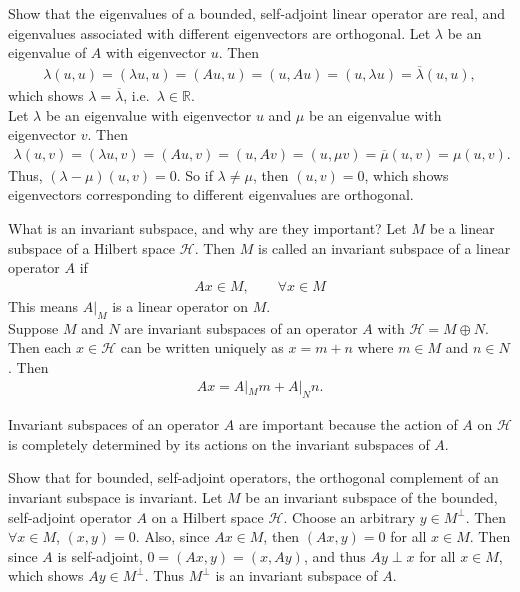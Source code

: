 \documentclass[avery5388,grid,frame]{flashcards}
\def\Rl{\mathbb{R}}
\def\hilb{\mathcal{H}}
\begin{document}
\begin{flashcard}
    {Show that the eigenvalues of a bounded, self-adjoint linear operator are real, and eigenvalues associated with different eigenvectors are orthogonal.}
    Let $\lambda$ be an eigenvalue of $A$ with eigenvector $u$.  Then
    \begin{align*}
        \lambda(u,u) = (\lambda u,u) = (Au,u) = (u,Au) = (u,\lambda u) = \overline{\lambda}(u,u),
    \end{align*}
    which shows $\lambda = \overline{\lambda}$, i.e.~$\lambda \in \Rl$. \\

    Let $\lambda$ be an eigenvalue with eigenvector $u$ and $\mu$ be an eigenvalue with eigenvector $v$.  Then
    \begin{align*}
        \lambda(u,v) = (\lambda u,v) = (Au, v) = (u, Av) = (u, \mu v) = \overline{\mu}(u,v) = \mu(u,v).
    \end{align*}
    Thus, $(\lambda - \mu)(u,v) = 0$.  So if $\lambda \neq \mu$, then $(u,v) = 0$, which shows eigenvectors corresponding to different eigenvalues are orthogonal.
\end{flashcard}

\begin{flashcard}
    {What is an invariant subspace, and why are they important?}
    Let $M$ be a linear subspace of a Hilbert space $\hilb$.  Then $M$ is called an invariant subspace of a linear operator $A$ if
    \begin{align*}
        Ax \in M, \qquad \forall x \in M
    \end{align*}
    This means $A|_M$ is a linear operator on $M$. \\

    Suppose $M$ and $N$ are invariant subspaces of an operator $A$ with $\hilb = M \oplus N$.  Then each $x \in \hilb$ can be written uniquely as $x = m + n$ where $m \in M$ and $n \in N$.  Then
    \begin{align*}
        Ax = A|_Mm + A|_Nn.
    \end{align*}

    Invariant subspaces of an operator $A$ are important because the action of $A$ on $\hilb$ is completely determined by its actions on the invariant subspaces of $A$.
\end{flashcard}

\begin{flashcard}
    {Show that for bounded, self-adjoint operators, the orthogonal complement of an invariant subspace is invariant.}
    Let $M$ be an invariant subspace of the bounded, self-adjoint operator $A$ on a Hilbert space $\hilb$.  Choose an arbitrary $y \in M^{\perp}$.  Then $\forall x \in M$, $(x,y) = 0$.  Also, since $Ax \in M$, then $(Ax, y) = 0$ for all $x \in M$.  Then since $A$ is self-adjoint, $0 = (Ax,y) = (x,Ay)$, and thus $Ay \perp x$ for all $x \in M$, which shows $Ay \in M^\perp$.  Thus $M^\perp$ is an invariant subspace of $A$.
\end{flashcard}
\end{document}
